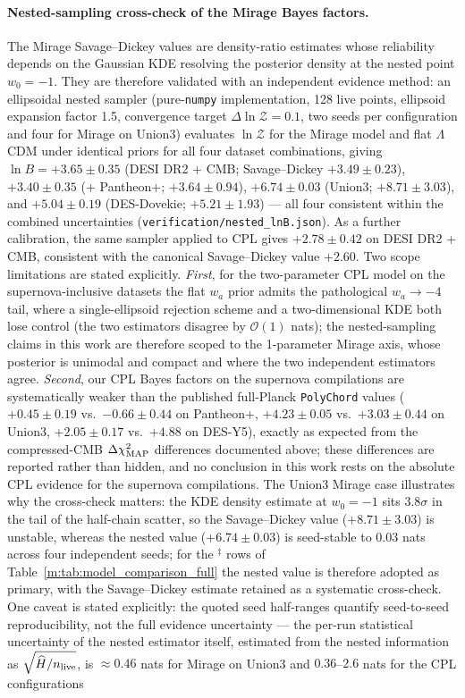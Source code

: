 \documentclass[aps,prd,preprint,superscriptaddress,nofootinbib]{revtex4-2}
\begin{document}
\paragraph{Nested-sampling cross-check of the Mirage Bayes factors.} The Mirage Savage--Dickey values are density-ratio estimates whose reliability depends on the Gaussian KDE resolving the posterior density at the nested point $w_0 = -1$. They are therefore validated with an independent evidence method: an ellipsoidal nested sampler (pure-\texttt{numpy} implementation, 128 live points, ellipsoid expansion factor 1.5, convergence target $\Delta\ln\mathcal{Z} = 0.1$, two seeds per configuration and four for Mirage on Union3) evaluates $\ln\mathcal{Z}$ for the Mirage model and flat $\Lambda$CDM under identical priors for all four dataset combinations, giving $\ln B = +3.65 \pm 0.35$ (DESI DR2 + CMB; Savage--Dickey $+3.49 \pm 0.23$), $+3.40 \pm 0.35$ (+ Pantheon+; $+3.64 \pm 0.94$), $+6.74 \pm 0.03$ (Union3; $+8.71 \pm 3.03$), and $+5.04 \pm 0.19$ (DES-Dovekie; $+5.21 \pm 1.93$) --- all four consistent within the combined uncertainties (\texttt{verification/nested\_lnB.json}). As a further calibration, the same sampler applied to CPL gives $+2.78 \pm 0.42$ on DESI DR2 + CMB, consistent with the canonical Savage--Dickey value $+2.60$. Two scope limitations are stated explicitly. \emph{First}, for the two-parameter CPL model on the supernova-inclusive datasets the flat $w_a$ prior admits the pathological $w_a \to -4$ tail, where a single-ellipsoid rejection scheme and a two-dimensional KDE both lose control (the two estimators disagree by $\mathcal{O}(1)$ nats); the nested-sampling claims in this work are therefore scoped to the 1-parameter Mirage axis, whose posterior is unimodal and compact and where the two independent estimators agree. \emph{Second}, our CPL Bayes factors on the supernova compilations are systematically weaker than the published full-Planck \texttt{PolyChord} values ($+0.45 \pm 0.19$ vs.\ $-0.66 \pm 0.44$ on Pantheon+, $+4.23 \pm 0.05$ vs.\ $+3.03 \pm 0.44$ on Union3, $+2.05 \pm 0.17$ vs.\ $+4.88$ on DES-Y5), exactly as expected from the compressed-CMB $\Delta\chi^2_{\rm MAP}$ differences documented above; these differences are reported rather than hidden, and no conclusion in this work rests on the absolute CPL evidence for the supernova compilations. The Union3 Mirage case illustrates why the cross-check matters: the KDE density estimate at $w_0 = -1$ sits $3.8\sigma$ in the tail of the half-chain scatter, so the Savage--Dickey value ($+8.71 \pm 3.03$) is unstable, whereas the nested value ($+6.74 \pm 0.03$) is seed-stable to $0.03$ nats across four independent seeds; for the $^{\ddagger}$ rows of Table~\ref{m:tab:model_comparison_full} the nested value is therefore adopted as primary, with the Savage--Dickey estimate retained as a systematic cross-check. One caveat is stated explicitly: the quoted seed half-ranges quantify seed-to-seed reproducibility, not the full evidence uncertainty --- the per-run statistical uncertainty of the nested estimator itself, estimated from the nested information as $\sqrt{\widehat{H}/n_{\rm live}}$, is $\approx 0.46$ nats for Mirage on Union3 and $0.36$--$2.6$ nats for the CPL configurations 
\end{document}
